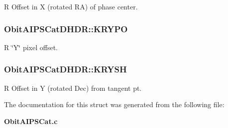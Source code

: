 R Offset in X (rotated RA) of phase center. 

\subsubsection{ {\bf Obit\-AIPSCat\-DHDR::KRYPO}}\label{structObitAIPSCatDHDR_o50}


R \char`\"{}Y\char`\"{} pixel offset. 

\subsubsection{ {\bf Obit\-AIPSCat\-DHDR::KRYSH}}\label{structObitAIPSCatDHDR_o24}


R Offset in Y (rotated Dec) from tangent pt. 



The documentation for this struct was generated from the following file:\begin{CompactItemize}
\item 
{\bf Obit\-AIPSCat.c}\end{CompactItemize}
